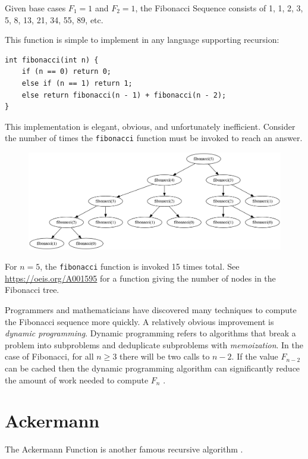\documentclass{book}
\begin{document}
Given base cases $F_1 = 1$ and $F_2 = 1$, the Fibonacci Sequence consists of 1, 1, 2, 3, 5, 8, 13, 21, 34, 55, 89, etc.

This function is simple to implement in any language supporting recursion:

\begin{lstlisting}
int fibonacci(int n) {
    if (n == 0) return 0;
    else if (n == 1) return 1;
    else return fibonacci(n - 1) + fibonacci(n - 2);
}
\end{lstlisting}

This implementation is elegant, obvious, and unfortunately inefficient. Consider the number of times the \texttt{fibonacci} function must be invoked to reach an answer.

\begin{figure}[ht]
\centering
\includegraphics[width=5in]{ch-recursion/Fibonacci}
\end{figure}

For $n=5$, the \texttt{fibonacci} function is invoked 15 times total. See \url{https://oeis.org/A001595} for a function giving the number of nodes in the Fibonacci tree.

Programmers and mathematicians have discovered many techniques to compute the Fibonacci sequence more quickly. A relatively obvious improvement is \textit{dynamic programming}. Dynamic programming refers to algorithms that break a problem into subproblems and deduplicate subproblems with \textit{memoization}. In the case of Fibonacci, for all $n \ge 3$ there will be two calls to $n-2$. If the value $F_{n-2}$ can be cached then the dynamic programming algorithm can significantly reduce the amount of work needed to compute $F_n$ \cite{nayuki}.

\section{Ackermann}

The Ackermann Function is another famous recursive algorithm \cite{weissteinAckermann}.
\end{document}
